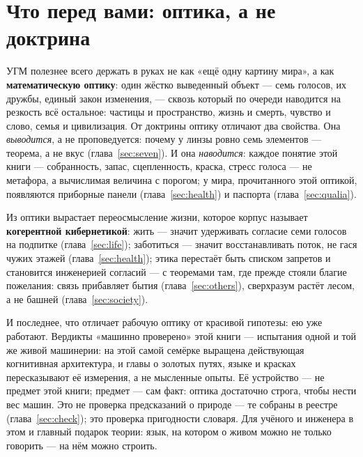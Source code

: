 \documentclass[11pt,letterpaper]{article}
\begin{document}
\section*{Что перед вами: оптика, а не доктрина}

УГМ полезнее всего держать в руках не как «ещё одну картину мира», а
как \textbf{математическую оптику}: один жёстко выведенный объект ---
семь голосов, их дружбы, единый закон изменения, --- сквозь который
по очереди наводится на резкость всё остальное: частицы и
пространство, жизнь и смерть, чувство и слово, семья и цивилизация.
От доктрины оптику отличают два свойства. Она \emph{выводится}, а не
проповедуется: почему у линзы ровно семь элементов --- теорема, а не
вкус (глава~\ref{sec:seven}). И она \emph{наводится}: каждое понятие
этой книги --- собранность, запас, сцепленность, краска, стресс
голоса --- не метафора, а вычислимая величина с порогом; у мира,
прочитанного этой оптикой, появляются приборные панели
(глава~\ref{sec:health}) и паспорта (глава~\ref{sec:qualia}).

Из оптики вырастает переосмысление жизни, которое корпус называет
\textbf{когерентной кибернетикой}: жить --- значит удерживать
согласие семи голосов на подпитке (глава~\ref{sec:life});
заботиться --- значит восстанавливать поток, не гася чужих этажей
(глава~\ref{sec:health}); этика перестаёт быть списком запретов и
становится инженерией согласий --- с теоремами там, где прежде
стояли благие пожелания: связь прибавляет бытия
(глава~\ref{sec:others}), сверхразум растёт лесом, а не башней
(глава~\ref{sec:society}).

И последнее, что отличает рабочую оптику от красивой гипотезы: ею
уже работают. Вердикты «машинно проверено» этой книги --- испытания
одной и той же живой машинерии: на этой самой семёрке выращена
действующая когнитивная архитектура, и главы о золотых путях, языке
и красках пересказывают её измерения, а не мысленные опыты. Её
устройство --- не предмет этой книги; предмет --- сам факт: оптика
достаточно строга, чтобы нести вес машин. Это не проверка
предсказаний о природе --- те собраны в реестре
(глава~\ref{sec:check}); это проверка пригодности словаря. Для
учёного и инженера в этом и главный подарок теории: язык, на
котором о живом можно не только говорить --- на нём можно строить.
\end{document}
